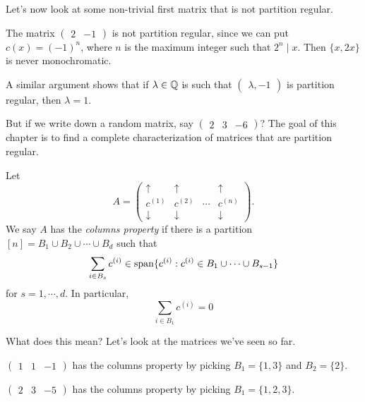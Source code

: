\documentclass[a4paper]{article}
\begin{document}
Let's now look at some non-trivial first matrix that is not partition regular.
\begin{eg}
  The matrix $\begin{pmatrix}2 & -1\end{pmatrix}$ is not partition regular, since we can put $c(x) = (-1)^n$, where $n$ is the maximum integer such that $2^n \mid x$. Then $\{x, 2x\}$ is never monochromatic.

  A similar argument shows that if $\lambda \in \mathbb{Q}$ is such that $\begin{pmatrix}\lambda, -1\end{pmatrix}$ is partition regular, then $\lambda = 1$.
\end{eg}
But if we write down a random matrix, say $\begin{pmatrix}2 & 3 & -6\end{pmatrix}$? The goal of this chapter is to find a complete characterization of matrices that are partition regular.

\begin{defi}
  Let
  \[
    A =
    \begin{pmatrix}
      \uparrow & \uparrow & & \uparrow\\
      c^{(1)} & c^{(2)} & \cdots & c^{(n)}\\
      \downarrow & \downarrow & & \downarrow
    \end{pmatrix}.
  \]
  We say $A$ has the \emph{columns property} if there is a partition $[n] = B_1 \cup B_2 \cup \cdots \cup B_d$ such that
  \[
    \sum_{i \in B_s} c^{(i)} \in \operatorname{span}\{c^{(i)} : c^{(i)} \in B_1 \cup \cdots \cup B_{s - 1}\}
  \]
  for $s = 1, \cdots, d$. In particular,
  \[
    \sum_{i \in B_1} c^{(i)} = 0
  \]
\end{defi}
What does this mean? Let's look at the matrices we've seen so far.
\begin{eg}
  $\begin{pmatrix}1 & 1 & -1\end{pmatrix}$ has the columns property by picking $B_1 = \{1, 3\}$ and $B_2 = \{2\}$.
\end{eg}

\begin{eg}
  $\begin{pmatrix}2 & 3 & -5\end{pmatrix}$ has the columns property by picking $B_1 = \{1, 2, 3\}$.
\end{eg}
\end{document}
